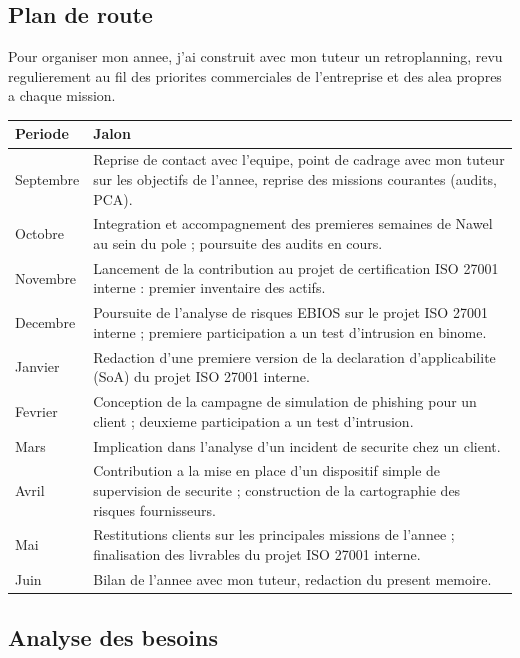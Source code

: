 \documentclass[11pt,a4paper]{article}
\begin{document}
\subsection{Plan de route}

Pour organiser mon annee, j'ai construit avec mon tuteur un retroplanning, revu regulierement au fil des priorites commerciales de l'entreprise et des alea propres a chaque mission.

\begin{center}
\small
\begin{longtable}{@{}p{2.6cm}p{10.8cm}@{}}
\toprule
\textbf{Periode} & \textbf{Jalon} \\
\midrule
\endhead
Septembre & Reprise de contact avec l'equipe, point de cadrage avec mon tuteur sur les objectifs de l'annee, reprise des missions courantes (audits, PCA). \\
Octobre & Integration et accompagnement des premieres semaines de Nawel au sein du pole ; poursuite des audits en cours. \\
Novembre & Lancement de la contribution au projet de certification ISO 27001 interne : premier inventaire des actifs. \\
Decembre & Poursuite de l'analyse de risques EBIOS sur le projet ISO 27001 interne ; premiere participation a un test d'intrusion en binome. \\
Janvier & Redaction d'une premiere version de la declaration d'applicabilite (SoA) du projet ISO 27001 interne. \\
Fevrier & Conception de la campagne de simulation de phishing pour un client ; deuxieme participation a un test d'intrusion. \\
Mars & Implication dans l'analyse d'un incident de securite chez un client. \\
Avril & Contribution a la mise en place d'un dispositif simple de supervision de securite ; construction de la cartographie des risques fournisseurs. \\
Mai & Restitutions clients sur les principales missions de l'annee ; finalisation des livrables du projet ISO 27001 interne. \\
Juin & Bilan de l'annee avec mon tuteur, redaction du present memoire. \\
\bottomrule
\end{longtable}
\end{center}

\subsection{Analyse des besoins}
\end{document}
